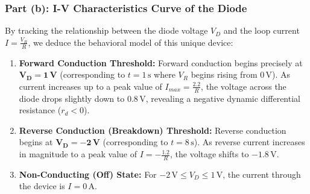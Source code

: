 \documentclass[12pt,a3paper]{article}
\begin{document}
\begin{enumerate}
\begin{tcolorbox}[enhanced,breakable,ansbox,colback=cA!4,colframe=cA,boxrule=0.8pt,arc=5pt,title={\textbf{Answer}},fonttitle=\bfseries\color{white},colbacktitle=cA]
\begin{center}
\end{center}

\vspace{0.5em}
\hrulefill
\vspace{0.5em}

\subsubsection*{Part (b): I-V Characteristics Curve of the Diode}

By tracking the relationship between the diode voltage $V_D$ and the loop current $I = \frac{V_R}{R}$, we deduce the behavioral model of this unique device:
\begin{enumerate}
    \item \textbf{Forward Conduction Threshold:} Forward conduction begins precisely at $\mathbf{V_D = 1\,\text{V}}$ (corresponding to $t=1\,\text{s}$ where $V_R$ begins rising from $0\,\text{V}$). As current increases up to a peak value of $I_{max} = \frac{2.2}{R}$, the voltage across the diode drops slightly down to $0.8\,\text{V}$, revealing a negative dynamic differential resistance ($r_d < 0$).
    \item \textbf{Reverse Conduction (Breakdown) Threshold:} Reverse conduction begins at $\mathbf{V_D = -2\,\text{V}}$ (corresponding to $t=8\,\text{s}$). As reverse current increases in magnitude to a peak value of $I = -\frac{1.2}{R}$, the voltage shifts to $-1.8\,\text{V}$.
    \item \textbf{Non-Conducting (Off) State:} For $-2\,\text{V} \le V_D \le 1\,\text{V}$, the current through the device is $I = 0\,\text{A}$.
\end{enumerate}

\begin{center}
\end{center}
\end{tcolorbox}
\end{enumerate}
\end{document}
